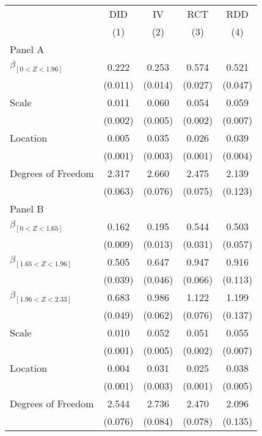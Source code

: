 \def\sym#1{\ifmmode^{#1}\else\(^{#1}\)\fi}
\begin{tabular}{l*{4}{c}}
\hline\hline
& \multicolumn{1}{c}{DID} &  \multicolumn{1}{c}{IV} &  \multicolumn{1}{c}{RCT} &  \multicolumn{1}{c}{RDD}\\

& \multicolumn{1}{c}{(1)} &  \multicolumn{1}{c}{(2)} &  \multicolumn{1}{c}{(3)} &  \multicolumn{1}{c}{(4)}\\

\hline
\hline

Panel A \\

$\beta_{[0 < Z < 1.96]}$ & 0.222 &  0.253 &  0.574 &  0.521\\
& (0.011) &  (0.014) &  (0.027) &  (0.047)\\

Scale & 0.011 &  0.060 &  0.054 &  0.059\\
& (0.002) &  (0.005) &  (0.002) &  (0.007)
\\

Location & 0.005 &  0.035 &  0.026 &  0.039\\
& (0.001) &  (0.003) &  (0.001) &  (0.004)
\\

Degrees of Freedom & 2.317 &  2.660 &  2.475 &  2.139\\
& (0.063) &  (0.076) &  (0.075) &  (0.123)\\
Panel B \\

$\beta_{[0 < Z < 1.65]}$ & 0.162 &  0.195 &  0.544 &  0.503\\
& (0.009) &  (0.013) &  (0.031) &  (0.057)\\

$\beta_{[1.65 < Z < 1.96]}$ & 0.505 &  0.647 &  0.947 &  0.916\\
& (0.039) &  (0.046) &  (0.066) &  (0.113)\\


$\beta_{[1.96 < Z < 2.33]}$ & 0.683 &  0.986 &  1.122 &  1.199\\
& (0.049) &  (0.062) &  (0.076) &  (0.137)\\

Scale & 0.010 &  0.052 &  0.051 &  0.055\\
& (0.001) &  (0.005) &  (0.002) &  (0.007)
\\

Location & 0.004 &  0.031 &  0.025 &  0.038\\
& (0.001) &  (0.003) &  (0.001) &  (0.005)
\\

Degrees of Freedom & 2.544 &  2.736 &  2.470 &  2.096\\
& (0.076) &  (0.084) &  (0.078) &  (0.135)\\

\hline\hline
\end{tabular}

